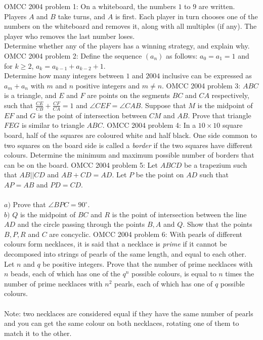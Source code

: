 OMCC 2004 problem 1:  On a whiteboard, the numbers $1$ to $9$ are written. Players $A$ and $B$ take turns, and $A$ is first. Each player in turn chooses one of the numbers on the whiteboard and removes it, along with all multiples (if any). The player who removes the last number loses. \\
Determine whether any of the players has a winning strategy, and explain why. 
OMCC 2004 problem 2:  Define the sequence $(a_n)$ as follows: $a_0=a_1=1$ and for $k\ge 2$, $a_k=a_{k-1}+a_{k-2}+1$. \\
Determine how many integers between $1$ and $2004$ inclusive can be expressed as $a_m+a_n$ with $m$ and $n$ positive integers and $m\not= n$. 
OMCC 2004 problem 3:  $ABC$ is a triangle, and $E$ and $F$ are points on the segments $BC$ and $CA$ respectively, such that $\frac{CE}{CB}+\frac{CF}{CA}=1$ and $\angle CEF=\angle CAB$. Suppose that $M$ is the midpoint of $EF$ and $G$ is the point of intersection between $CM$ and $AB$. Prove that triangle $FEG$ is similar to triangle $ABC$. 
OMCC 2004 problem 4:  In a $10\times 10$ square board, half of the squares are coloured white and half black. One side common to two squares on the board side is called a \textit{border} if the two squares have different colours. Determine the minimum and maximum possible number of borders that can be on the board. 
OMCC 2004 problem 5:  Let $ABCD$ be a trapezium such that $AB||CD$ and $AB+CD=AD$. Let $P$ be the point on $AD$ such that $AP=AB$ and $PD=CD$. \\\\
$a)$ Prove that $\angle BPC=90^{\circ}$. \\
$b)$ $Q$ is the midpoint of $BC$ and $R$ is the point of intersection between the line $AD$ and the circle passing through the points $B,A$ and $Q$. Show that the points $B,P,R$ and $C$ are concyclic. 
OMCC 2004 problem 6:  With pearls of different colours form necklaces, it is said that a necklace is \textit{prime} if it cannot be decomposed into strings of pearls of the same length, and equal to each other. \\
Let $n$ and $q$ be positive integers. Prove that the number of prime necklaces with $n$ beads, each of which has one of the $q^n$ possible colours, is equal to $n$ times the number of prime necklaces with $n^2$ pearls, each of which has one of $q$ possible colours. \\\\
Note: two necklaces are considered equal if they have the same number of pearls and you can get the same colour on both necklaces, rotating one of them to match it to the other. 

